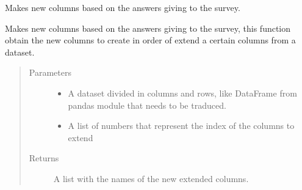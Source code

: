 \documentclass[letterpaper,10pt,english]{sphinxmanual}
\begin{document}

\begin{fulllineitems}
\label{\detokenize{index:SurveyHumpbackWhale.make_new_columns_from_answers}}
Makes new columns based on the answers giving to the survey.

Makes new columns based on the answers giving to the survey, this function
obtain the new columns to create in order of extend a certain columns
from a dataset.
\begin{quote}\begin{description}
\item[{Parameters}] \leavevmode\begin{itemize}
\item {} 
 \textendash{} A dataset divided in columns and rows, like DataFrame from
pandas module that needs to be traduced.

\item {} 
 \textendash{} A list of numbers that represent the index of the
columns to extend

\end{itemize}

\item[{Returns}] \leavevmode
A list with the names of the new extended columns.

\end{description}\end{quote}

\end{fulllineitems}

\end{document}
